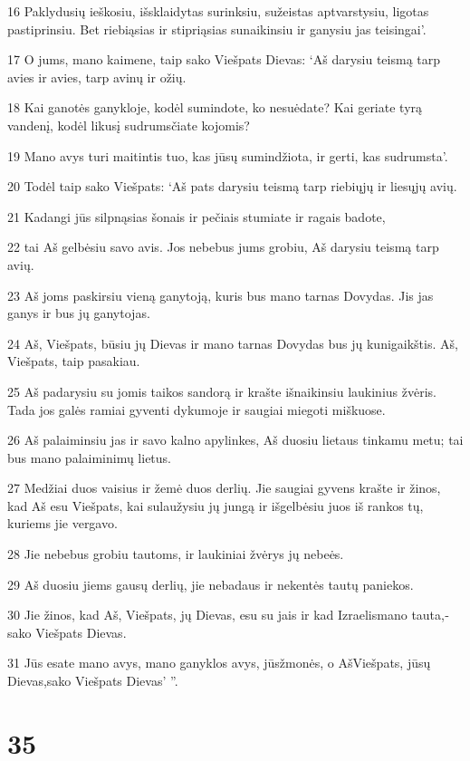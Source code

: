 \par 16 Paklydusių ieškosiu, išsklaidytas surinksiu, sužeistas aptvarstysiu, ligotas pastiprinsiu. Bet riebiąsias ir stipriąsias sunaikinsiu ir ganysiu jas teisingai’. 
\par 17 O jums, mano kaimene, taip sako Viešpats Dievas: ‘Aš darysiu teismą tarp avies ir avies, tarp avinų ir ožių. 
\par 18 Kai ganotės ganykloje, kodėl sumindote, ko nesuėdate? Kai geriate tyrą vandenį, kodėl likusį sudrumsčiate kojomis? 
\par 19 Mano avys turi maitintis tuo, kas jūsų sumindžiota, ir gerti, kas sudrumsta’. 
\par 20 Todėl taip sako Viešpats: ‘Aš pats darysiu teismą tarp riebiųjų ir liesųjų avių. 
\par 21 Kadangi jūs silpnąsias šonais ir pečiais stumiate ir ragais badote, 
\par 22 tai Aš gelbėsiu savo avis. Jos nebebus jums grobiu, Aš darysiu teismą tarp avių. 
\par 23 Aš joms paskirsiu vieną ganytoją, kuris bus mano tarnas Dovydas. Jis jas ganys ir bus jų ganytojas. 
\par 24 Aš, Viešpats, būsiu jų Dievas ir mano tarnas Dovydas bus jų kunigaikštis. Aš, Viešpats, taip pasakiau. 
\par 25 Aš padarysiu su jomis taikos sandorą ir krašte išnaikinsiu laukinius žvėris. Tada jos galės ramiai gyventi dykumoje ir saugiai miegoti miškuose. 
\par 26 Aš palaiminsiu jas ir savo kalno apylinkes, Aš duosiu lietaus tinkamu metu; tai bus mano palaiminimų lietus. 
\par 27 Medžiai duos vaisius ir žemė duos derlių. Jie saugiai gyvens krašte ir žinos, kad Aš esu Viešpats, kai sulaužysiu jų jungą ir išgelbėsiu juos iš rankos tų, kuriems jie vergavo. 
\par 28 Jie nebebus grobiu tautoms, ir laukiniai žvėrys jų nebeės. 
\par 29 Aš duosiu jiems gausų derlių, jie nebadaus ir nekentės tautų paniekos. 
\par 30 Jie žinos, kad Aš, Viešpats, jų Dievas, esu su jais ir kad Izraelis­mano tauta,­sako Viešpats Dievas.­ 
\par 31 Jūs esate mano avys, mano ganyklos avys, jūs­žmonės, o Aš­Viešpats, jūsų Dievas,­sako Viešpats Dievas’ ”.



\chapter{35}


